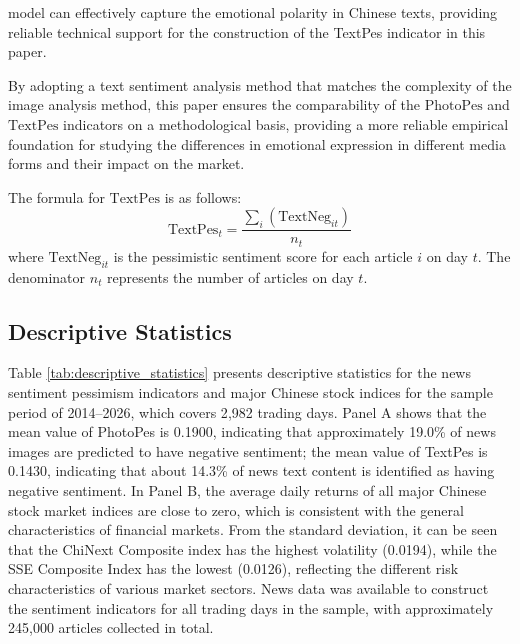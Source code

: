 \documentclass[AER]{AEA}
\begin{document}
model can effectively capture the emotional polarity in Chinese texts, providing reliable technical support for the construction of the TextPes indicator in this paper.

By adopting a text sentiment analysis method that matches the complexity of the image analysis method, this paper ensures the comparability of the $\text{PhotoPes}$ and $\text{TextPes}$ indicators on a methodological basis, providing a more reliable empirical foundation for studying the differences in emotional expression in different media forms and their impact on the market.

The formula for $\text{TextPes}$ is as follows:
\begin{equation}
\text{TextPes}_t = \frac{\sum_i (\text{TextNeg}_{it})}{n_t}
\end{equation}
where $\text{TextNeg}_{it}$ is the pessimistic sentiment score for each article $i$ on day $t$. The denominator $n_t$ represents the number of articles on day $t$.

\subsection{Descriptive Statistics}
Table \ref{tab:descriptive_statistics} presents descriptive statistics for the news sentiment pessimism indicators and major Chinese stock indices for the sample period of 2014--2026, which covers 2{,}982 trading days. Panel A shows that the mean value of PhotoPes is 0.1900, indicating that approximately 19.0\% of news images are predicted to have negative sentiment; the mean value of TextPes is 0.1430, indicating that about 14.3\% of news text content is identified as having negative sentiment. In Panel B, the average daily returns of all major Chinese stock market indices are close to zero, which is consistent with the general characteristics of financial markets. From the standard deviation, it can be seen that the ChiNext Composite index has the highest volatility (0.0194), while the SSE Composite Index has the lowest (0.0126), reflecting the different risk characteristics of various market sectors. News data was available to construct the sentiment indicators for all trading days in the sample, with approximately 245{,}000 articles collected in total.
\end{document}
